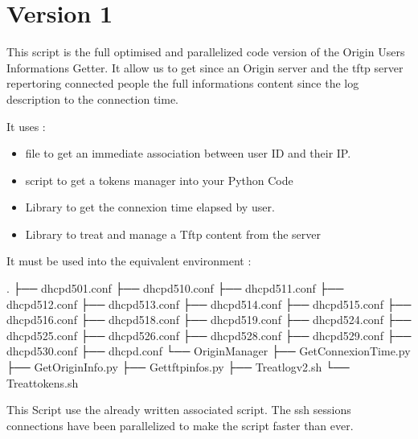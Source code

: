 \documentclass[letterpaper,10pt,english]{sphinxmanual}
\begin{document}
\newpage
\section{Version 1}
\label{\detokenize{Get_Origin_Info:version-1}}
\sphinxAtStartPar
This script is the full optimised and parallelized code version of the Origin Users Informations Getter.
It allow us to get since an Origin server and the tftp server repertoring connected people the full informations content since the log description to the connection time.

\sphinxAtStartPar
It uses :
\begin{itemize}
\item {} 
\sphinxAtStartPar
{} file to get an immediate association between user ID and their IP.

\item {} 
\sphinxAtStartPar
{} script to get a tokens manager into your Python Code

\item {} 
\sphinxAtStartPar
{} Library to get the connexion time elapsed by user.

\item {} 
\sphinxAtStartPar
{} Library to treat and manage a Tftp content from the server

\end{itemize}

\sphinxAtStartPar
It must be used into the equivalent environment :

\begin{sphinxVerbatim}[commandchars=\\\{\}]
.
├── dhcpd\PYGZhy{}501.conf
├── dhcpd\PYGZhy{}510.conf
├── dhcpd\PYGZhy{}511.conf
├── dhcpd\PYGZhy{}512.conf
├── dhcpd\PYGZhy{}513.conf
├── dhcpd\PYGZhy{}514.conf
├── dhcpd\PYGZhy{}515.conf
├── dhcpd\PYGZhy{}516.conf
├── dhcpd\PYGZhy{}518.conf
├── dhcpd\PYGZhy{}519.conf
├── dhcpd\PYGZhy{}524.conf
├── dhcpd\PYGZhy{}525.conf
├── dhcpd\PYGZhy{}526.conf
├── dhcpd\PYGZhy{}528.conf
├── dhcpd\PYGZhy{}529.conf
├── dhcpd\PYGZhy{}530.conf
├── dhcpd.conf
└── Origin\PYGZus{}Manager
    ├── Get\PYGZus{}Connexion\PYGZus{}Time.py
    ├── Get\PYGZus{}Origin\PYGZus{}Info.py
    ├── Get\PYGZus{}tftp\PYGZus{}infos.py
    ├── Treat\PYGZus{}log\PYGZus{}v2.sh
    └── Treat\PYGZus{}tokens.sh
\end{sphinxVerbatim}

\sphinxAtStartPar
This Script use the already written associated script.
The ssh sessions connections have been parallelized to make the script faster than ever.
\end{document}
